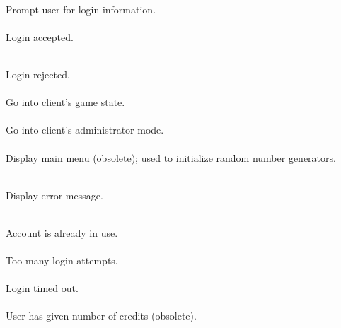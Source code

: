 \begin{protocol}
 \\
Prompt user for login information. \\

  \\
Login accepted. \\ 

 \\
Login rejected. \\

 \\
Go into client's game state. \\

 \\
Go into client's administrator mode. \\

      \\
Display main menu (obsolete); used to initialize random number
generators. \\

   \\
Display error message. \\

 \\
Account is already in use. \\

 \\
Too many login attempts. \\

 \\
Login timed out. \\

  \\
User has given number of credits (obsolete). \\


\end{protocol}
